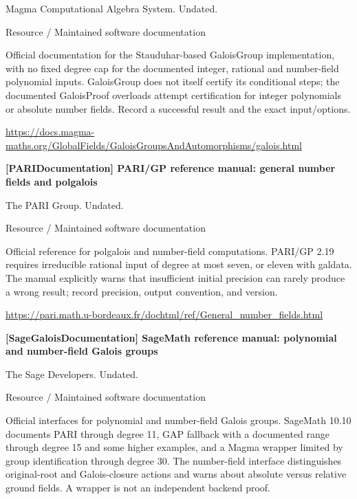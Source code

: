 \documentclass[11pt,a4paper,oneside,openany]{book}
\begin{document}
\color{black} Magma Computational Algebra System. Undated.\par
{\small\sffamily\color{atlasgold}Resource / Maintained software documentation}\par
\color{black} Official documentation for the Stauduhar-based GaloisGroup implementation, with no fixed degree cap for the documented integer, rational and number-field polynomial inputs. GaloisGroup does not itself certify its conditional steps; the documented GaloisProof overloads attempt certification for integer polynomials or absolute number fields. Record a successful result and the exact input/options.\par
{\footnotesize\url{https://docs.magma-maths.org/GlobalFields/GaloisGroupsAndAutomorphisms/galois.html}}\par
\vspace{9pt}
\hypertarget{ref:PARIDocumentation}{}
{\sffamily\bfseries\color{atlasgreen}[PARIDocumentation] PARI/GP reference manual: general number fields and polgalois}\par
\color{black} The PARI Group. Undated.\par
{\small\sffamily\color{atlasgold}Resource / Maintained software documentation}\par
\color{black} Official reference for polgalois and number-field computations. PARI/GP 2.19 requires irreducible rational input of degree at most seven, or eleven with galdata. The manual explicitly warns that insufficient initial precision can rarely produce a wrong result; record precision, output convention, and version.\par
{\footnotesize\url{https://pari.math.u-bordeaux.fr/dochtml/ref/General_number_fields.html}}\par
\vspace{9pt}
\hypertarget{ref:SageGaloisDocumentation}{}
{\sffamily\bfseries\color{atlasgreen}[SageGaloisDocumentation] SageMath reference manual: polynomial and number-field Galois groups}\par
\color{black} The Sage Developers. Undated.\par
{\small\sffamily\color{atlasgold}Resource / Maintained software documentation}\par
\color{black} Official interfaces for polynomial and number-field Galois groups. SageMath 10.10 documents PARI through degree 11, GAP fallback with a documented range through degree 15 and some higher examples, and a Magma wrapper limited by group identification through degree 30. The number-field interface distinguishes original-root and Galois-closure actions and warns about absolute versus relative ground fields. A wrapper is not an independent backend proof.\par
\end{document}
